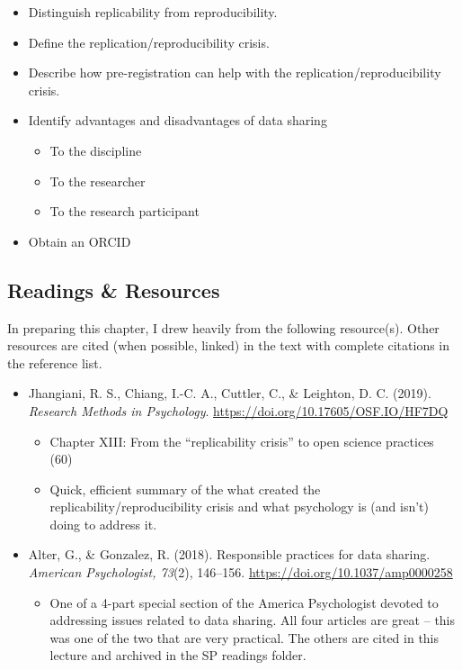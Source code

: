 \documentclass[
  english,
]{book}
\providecommand{\tightlist}{%
  \setlength{\itemsep}{0pt}\setlength{\parskip}{0pt}}
\begin{document}
\begin{itemize}
\tightlist
\item
  Distinguish replicability from reproducibility.
\item
  Define the replication/reproducibility crisis.
\item
  Describe how pre-registration can help with the replication/reproducibility crisis.
\item
  Identify advantages and disadvantages of data sharing

  \begin{itemize}
  \tightlist
  \item
    To the discipline
  \item
    To the researcher
  \item
    To the research participant
  \end{itemize}
\item
  Obtain an ORCID
\end{itemize}

\hypertarget{readings-resources-7}{%
\subsection{Readings \& Resources}\label{readings-resources-7}}

In preparing this chapter, I drew heavily from the following resource(s). Other resources are cited (when possible, linked) in the text with complete citations in the reference list.

\begin{itemize}
\tightlist
\item
  Jhangiani, R. S., Chiang, I.-C. A., Cuttler, C., \& Leighton, D. C. (2019). \emph{Research Methods in Psychology}. \url{https://doi.org/10.17605/OSF.IO/HF7DQ}

  \begin{itemize}
  \tightlist
  \item
    Chapter XIII: From the ``replicability crisis'' to open science practices (60)
  \item
    Quick, efficient summary of the what created the replicability/reproducibility crisis and what psychology is (and isn't) doing to address it.
  \end{itemize}
\item
  Alter, G., \& Gonzalez, R. (2018). Responsible practices for data sharing. \emph{American Psychologist, 73}(2), 146--156. \url{https://doi.org/10.1037/amp0000258}

  \begin{itemize}
  \tightlist
  \item
    One of a 4-part special section of the America Psychologist devoted to addressing issues related to data sharing. All four articles are great -- this was one of the two that are very practical. The others are cited in this lecture and archived in the SP readings folder.
  \end{itemize}
\end{itemize}
\end{document}
